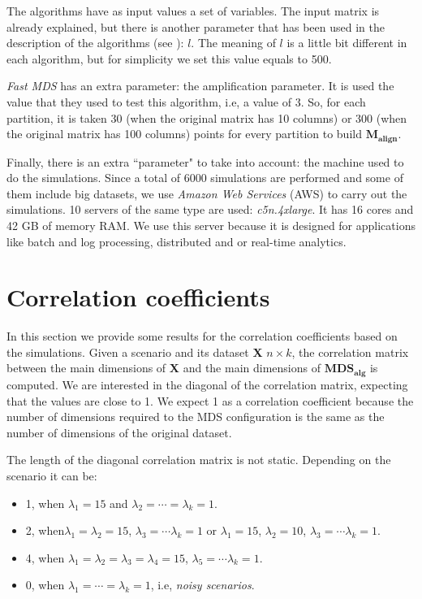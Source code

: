 \documentclass[11pt]{report}
\begin{document}
\indent The algorithms have as input values a set of variables. The input matrix 
is already explained, but there is another parameter that has been used in 
the description of the algorithms (see ): $l$. The meaning of 
$l$ is a little bit different in each algorithm, but for simplicity we 
set this value equals to 500. 

\indent \textit{Fast MDS} has an extra parameter: the amplification parameter.
It is used the value that they used to test this algorithm, i.e, a value of
3. So, for each partition, it is taken 30 (when the original matrix
has 10 columns) or 300 (when the original matrix has 100 columns) points for
every partition to build $\mathbf{M_{align}}$.

\indent Finally, there is an extra ``parameter" to take into account: the 
machine used to do the simulations. Since a total of 6000 simulations are
performed and some of them include big datasets, we use 
\textit{Amazon Web Services} (AWS) to carry out the simulations. 
10 servers of the same type are used: \textit{c5n.4xlarge}. It 
has 16 cores and 42 GB of memory RAM. We use this server because it is 
designed for applications like batch and log processing, distributed and or 
real-time analytics. 

\section{Correlation coefficients}
In this section we provide some results for the correlation coefficients based
on the simulations. Given a scenario and its dataset \textbf{X} 
$n \times k$, the correlation matrix between the main dimensions of \textbf{X} 
and the main dimensions of $\mathbf{MDS_{alg}}$ is computed. We are interested
in the diagonal of the correlation matrix, expecting that the values are close
to 1. We expect 1 as a correlation coefficient because the number of dimensions
required to the MDS configuration is the same as the number of dimensions of
the original dataset.

\indent The length of the diagonal correlation matrix is not static. Depending
on the scenario it can be:

\begin{itemize}
\item 1, when  $\lambda_1 = 15$ and $\lambda_2 = \cdots = \lambda_k = 1$.

\item 2, when$\lambda_1  = \lambda_2 = 15$, $\lambda_3 = \cdots \lambda_k = 1$
or $\lambda_1  = 15$, $\lambda_2 =10$, $\lambda_3 = \cdots \lambda_k = 1$.

\item 4, when $\lambda_1  = \lambda_2 = \lambda_3 = \lambda_4 = 15$, 
$\lambda_5 = \cdots \lambda_k = 1$.

\item 0, when $\lambda_1 = \cdots = \lambda_k = 1$, i.e, 
\textit{noisy scenarios}.

\end{itemize}
\end{document}
